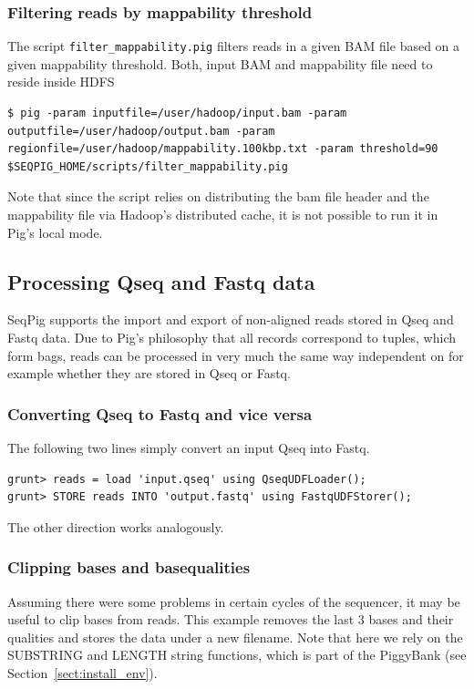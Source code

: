 \subsubsection{Filtering reads by mappability threshold}
The script {\tt filter\_mappability.pig} filters reads in a given BAM file based on a given
mappability threshold. Both, input BAM and mappability file need to reside inside HDFS
\begin{lstlisting}
$ pig -param inputfile=/user/hadoop/input.bam -param outputfile=/user/hadoop/output.bam -param regionfile=/user/hadoop/mappability.100kbp.txt -param threshold=90 $SEQPIG_HOME/scripts/filter_mappability.pig
\end{lstlisting}
Note that since the script relies on distributing the bam file header and the mappability file via Hadoop's distributed cache,
it is not possible to run it in Pig's local mode.

\subsection{Processing Qseq and Fastq data}

SeqPig supports the import and export of non-aligned reads stored in Qseq and
Fastq data. Due to Pig's philosophy that all records correspond to tuples, which
form bags, reads can be processed in very much the same way independent
on for example whether they are stored in Qseq or Fastq.

\subsubsection{Converting Qseq to Fastq and vice versa}

The following two lines simply convert an input Qseq into Fastq.
\begin{lstlisting}
grunt> reads = load 'input.qseq' using QseqUDFLoader();
grunt> STORE reads INTO 'output.fastq' using FastqUDFStorer(); 
\end{lstlisting}
The other direction works analogously.

\subsubsection{Clipping bases and basequalities}

\label{sect:read_clipping}

Assuming there were some problems in certain cycles of the sequencer, it
may be useful to clip bases from reads. This example removes the last 3
bases and their qualities and stores the data under a new filename. Note
that here we rely on the SUBSTRING and LENGTH string functions, which is
part of the PiggyBank (see Section~\ref{sect:install_env}).

